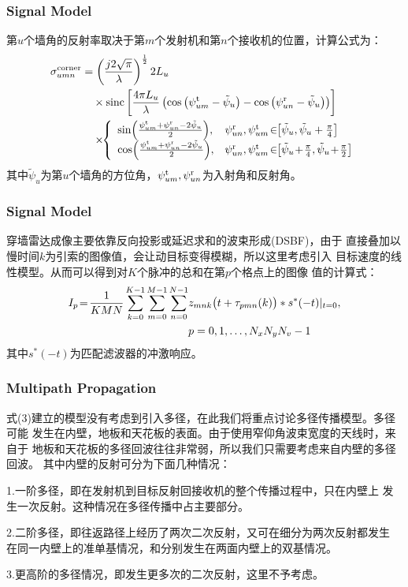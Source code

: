 \documentclass[cjk]{beamer}
\begin{document}
  \begin{frame}
	\frametitle{Signal Model}
	第$u$个墙角的反射率取决于第$m$个发射机和第$n$个接收机的位置，计算公式为：
	\begin{equation}
	  \begin{split}
	  \sigma_{umn}^{\rm corner}& =\left({j2\sqrt{\pi}\over\lambda}\right)^{1\over 2}2L_{u}\\
	 &\quad\times{\rm sinc}\left[{4\pi L_{u}\over\lambda}\left(\cos\left(\psi_{um}^{\rm t}-\tilde{\psi}_{u}\right)-\cos\left(\psi_{un}^{\rm r}-\tilde{\psi}_{u}\right)\right)\right]\\
	 &\quad\times\!\!\left\{ \begin{array}{ll}\sin\!\left({\psi_{um}^{\rm t}+\psi_{un}^{\rm r}-2\tilde{\psi}_{u}\over 2}\right)\!, & \psi_{un}^{\rm r},\psi_{um}^{\rm t}\!\in\!\!\left[\tilde{\psi}_{u},\tilde{\psi}_{u}+{\pi\over 4}\right]\\
	  \cos\!\left({\psi_{um}^{\rm t}+\psi_{un}^{\rm r}-2\tilde{\psi}_{u}\over 2}\right)\!, & \psi_{un}^{\rm r},\psi_{um}^{\rm t}\!\in\!\!\left[\tilde{\psi}_{u}\!+\!{\pi\over 4},\tilde{\psi}_{u}\!+\!{\pi\over 2}\right]
	\end{array} \right.
	  \end{split}
	\end{equation}
	其中$\tilde{\psi}_{u}$为第$u$个墙角的方位角，$\psi_{um}^{\rm t},\psi_{un}^{\rm r}$为入射角和反射角。
  \end{frame}
  \begin{frame}
	\frametitle{Signal Model}
	穿墙雷达成像主要依靠反向投影或延迟求和的波束形成(DSBF)，由于
	直接叠加以慢时间$k$为引索的图像值，会让动目标变得模糊，所以这里考虑引入
	目标速度的线性模型。从而可以得到对$K$个脉冲的总和在第$p$个格点上的图像
	值的计算式：
	\begin{equation}
	  \begin{split}
	  I_{p}\!=\!{1\over KMN}\sum_{k=0}^{K-1}\sum_{m=0}^{M-1}\sum_{n=0}^{N-1}&z_{mnk}\big(t+\tau_{pmn}(k)  \big)\ast s^{\ast}(-t)\vert _{t=0},\\
	  & p=0, 1,\ldots, N_{x}N_{y}N_{v}-1 
	  \end{split}
	\end{equation}
	其中$s^{\ast}(-t)$为匹配滤波器的冲激响应。
  \end{frame}
  \begin{frame}
	\frametitle{Multipath Propagation}
	式(3)建立的模型没有考虑到引入多径，在此我们将重点讨论多径传播模型。多径可能
	发生在内壁，地板和天花板的表面。由于使用窄仰角波束宽度的天线时，来自于
	地板和天花板的多径回波往往非常弱，所以我们只需要考虑来自内壁的多径回波。
	其中内壁的反射可分为下面几种情况：
	\par 1.一阶多径，即在发射机到目标反射回接收机的整个传播过程中，只在内壁上
	发生一次反射。这种情况在多径传播中占主要部分。
	\par 2.二阶多径，即往返路径上经历了两次二次反射，又可在细分为两次反射都发生
	在同一内壁上的准单基情况，和分别发生在两面内壁上的双基情况。
	\par 3.更高阶的多径情况，即发生更多次的二次反射，这里不予考虑。
  \end{frame}
\end{document}
